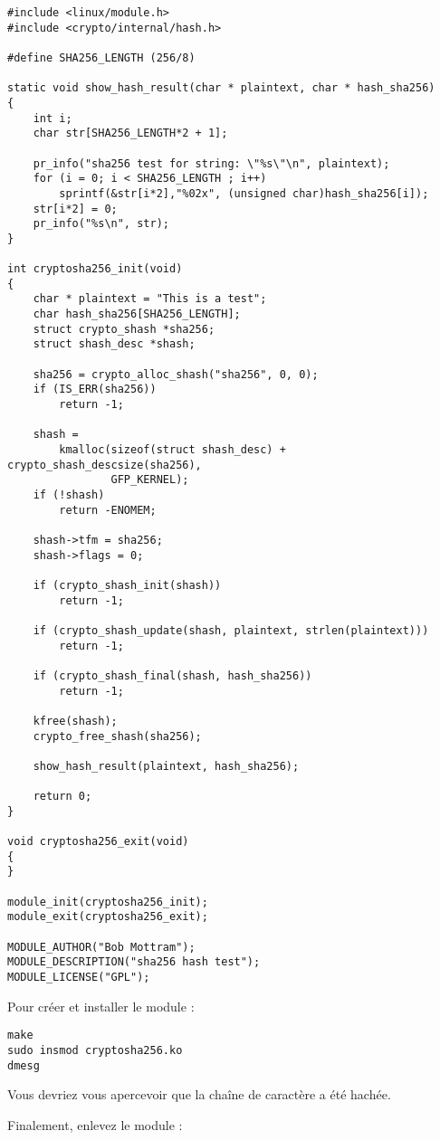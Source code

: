 \documentclass[11pt]{article}
\begin{document}
\begin{verbatim}
#include <linux/module.h>
#include <crypto/internal/hash.h>

#define SHA256_LENGTH (256/8)

static void show_hash_result(char * plaintext, char * hash_sha256)
{
    int i;
    char str[SHA256_LENGTH*2 + 1];

    pr_info("sha256 test for string: \"%s\"\n", plaintext);
    for (i = 0; i < SHA256_LENGTH ; i++)
        sprintf(&str[i*2],"%02x", (unsigned char)hash_sha256[i]);
    str[i*2] = 0;
    pr_info("%s\n", str);
}

int cryptosha256_init(void)
{
    char * plaintext = "This is a test";
    char hash_sha256[SHA256_LENGTH];
    struct crypto_shash *sha256;
    struct shash_desc *shash;

    sha256 = crypto_alloc_shash("sha256", 0, 0);
    if (IS_ERR(sha256))
        return -1;

    shash =
        kmalloc(sizeof(struct shash_desc) + crypto_shash_descsize(sha256),
                GFP_KERNEL);
    if (!shash)
        return -ENOMEM;

    shash->tfm = sha256;
    shash->flags = 0;

    if (crypto_shash_init(shash))
        return -1;

    if (crypto_shash_update(shash, plaintext, strlen(plaintext)))
        return -1;

    if (crypto_shash_final(shash, hash_sha256))
        return -1;

    kfree(shash);
    crypto_free_shash(sha256);

    show_hash_result(plaintext, hash_sha256);

    return 0;
}

void cryptosha256_exit(void)
{
}

module_init(cryptosha256_init);
module_exit(cryptosha256_exit);

MODULE_AUTHOR("Bob Mottram");
MODULE_DESCRIPTION("sha256 hash test");
MODULE_LICENSE("GPL");
\end{verbatim}

Pour créer et installer le module :

\begin{verbatim}
make
sudo insmod cryptosha256.ko
dmesg
\end{verbatim}

Vous devriez vous apercevoir que la chaîne de caractère a été hachée.

Finalement, enlevez le module :
\end{document}

